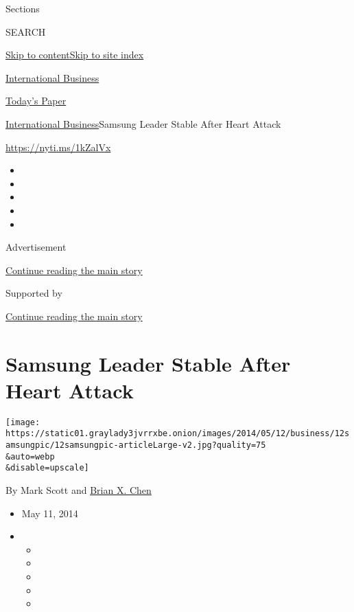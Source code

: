 Sections

SEARCH

\protect\hyperlink{site-content}{Skip to
content}\protect\hyperlink{site-index}{Skip to site index}

\href{https://www.nytimes3xbfgragh.onion/section/business}{International
Business}

\href{https://myaccount.nytimes3xbfgragh.onion/auth/login?response_type=cookie\&client_id=vi}{}

\href{https://www.nytimes3xbfgragh.onion/section/todayspaper}{Today's
Paper}

\href{/section/business}{International Business}\textbar{}Samsung Leader
Stable After Heart Attack

\url{https://nyti.ms/1kZalVx}

\begin{itemize}
\item
\item
\item
\item
\item
\end{itemize}

Advertisement

\protect\hyperlink{after-top}{Continue reading the main story}

Supported by

\protect\hyperlink{after-sponsor}{Continue reading the main story}

\hypertarget{samsung-leader-stable-after-heart-attack}{%
\section{Samsung Leader Stable After Heart
Attack}\label{samsung-leader-stable-after-heart-attack}}

\texttt{[image: https://static01.graylady3jvrrxbe.onion/images/2014/05/12/business/12samsungpic/12samsungpic-articleLarge-v2.jpg?quality=75\\\&auto=webp\\\&disable=upscale]}

By Mark Scott and
\href{http://www.nytimes3xbfgragh.onion/by/brian-x-chen}{Brian X. Chen}

\begin{itemize}
\item
  May 11, 2014
\item
  \begin{itemize}
  \item
  \item
  \item
  \item
  \item
  \end{itemize}
\end{itemize}

